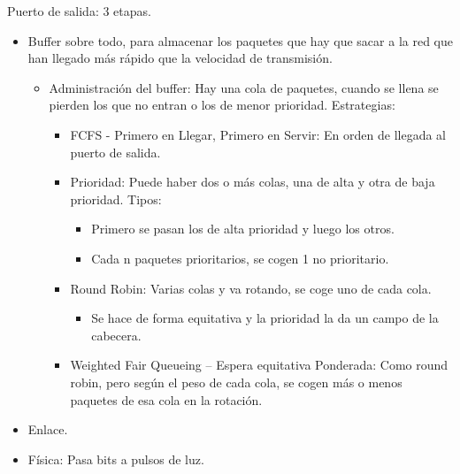 \documentclass[12pt, twoside, openright]{report} %
\begin{document}
Puerto de salida: 3 etapas.

\begin{itemize}
	\item Buffer sobre todo, para almacenar los paquetes que hay que sacar a
	      la red que han llegado más rápido que la velocidad de transmisión.

	      \begin{itemize}
		      \item Administración del buffer: Hay una cola de paquetes, cuando se
		            llena se pierden los que no entran o los de menor prioridad.
		            Estrategias:

		            \begin{itemize}
			            \item FCFS - Primero en Llegar, Primero en Servir: En orden de
			                  llegada al puerto de salida.
			            \item Prioridad: Puede haber dos o más colas, una de alta y otra de
			                  baja prioridad. Tipos:

			                  \begin{itemize}
				                  \item Primero se pasan los de alta prioridad y luego los otros.
				                  \item Cada n paquetes prioritarios, se cogen 1 no prioritario.
			                  \end{itemize}
			            \item Round Robin: Varias colas y va rotando, se coge uno de cada
			                  cola.

			                  \begin{itemize}
				                  \item Se hace de forma equitativa y la prioridad la da un campo de
				                        la cabecera.
			                  \end{itemize}
			            \item Weighted Fair Queueing -- Espera equitativa Ponderada: Como
			                  round robin, pero según el peso de cada cola, se cogen más o
			                  menos paquetes de esa cola en la rotación.
		            \end{itemize}
	      \end{itemize}
	\item Enlace.
	\item Física: Pasa bits a pulsos de luz.
\end{itemize}
\pagebreak
\end{document}
